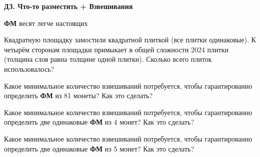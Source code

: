 \centerline{\bf \Huge ДЗ. Что-то разместить + Взвешивания}
\centerline{\bf \Huge }


\begin{flushright}
        \scriptsize{\textbf{ФМ} весят легче настоящих}
\end{flushright}

 Квадратную площадку замостили квадратной плиткой (все плитки одинаковые). К четырём сторонам площадки примыкает в общей сложности 2024 плитки (толщина слоя равна толщине одной плитки). Сколько всего плиток использовалось?

 Какое минимальное количество взвешиваний потребуется, чтобы гарантированно определить \textbf{ФМ} из 81 монеты? Как это сделать?

 Какое минимальное количество взвешиваний потребуется, чтобы гарантированно определить две одинаковые \textbf{ФМ} из 4 монет? Как это сделать?

 Какое минимальное количество взвешиваний потребуется, чтобы гарантированно определить две одинаковые \textbf{ФМ} из 5 монет? Как это сделать?